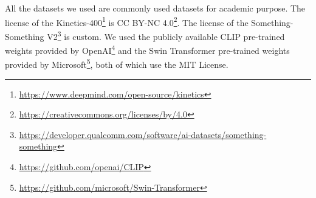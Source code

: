 All the datasets we used are commonly used datasets for academic purpose.  The license of the Kinetics-400\footnote{\url{https://www.deepmind.com/open-source/kinetics}} is CC BY-NC 4.0\footnote{\url{https://creativecommons.org/licenses/by/4.0}}. The license of the Something-Something V2\footnote{\url{https://developer.qualcomm.com/software/ai-datasets/something-something}} is custom. We used the publicly available CLIP pre-trained weights provided by OpenAI\footnote{\url{https://github.com/openai/CLIP}} and the Swin Transformer pre-trained weights provided by Microsoft\footnote{\url{https://github.com/microsoft/Swin-Transformer}}, both of which use the MIT License.

